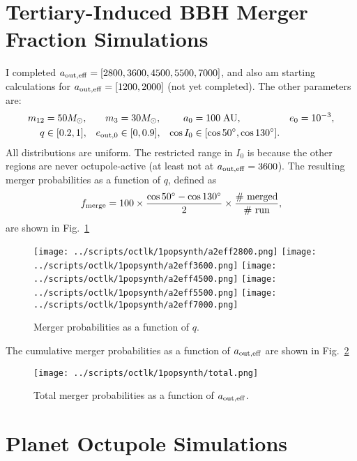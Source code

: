 \documentclass[11pt,
        usenames, %
        dvipsnames %
    ]{article}
\begin{document}
\onehalfspacing

\section{Tertiary-Induced BBH Merger Fraction Simulations}

I completed $a_{\rm out, eff} = [2800, 3600, 4500, 5500, 7000]$, and also am
starting calculations for $a_{\rm out, eff} = [1200, 2000]$ (not yet
completed). The other parameters are:
\begin{align*}
    m_{12} &= 50M_{\odot}, &
    m_3 &= 30M_{\odot}, &
    a_0 &= 100\;\mathrm{AU}, &
    e_0 &= 10^{-3},\\
    q &\in [0.2, 1], &
    e_{\rm out, 0} &\in [0, 0.9], &
    \cos I_0 &\in [\cos 50^\circ, \cos 130^\circ].
\end{align*}
All distributions are uniform. The restricted range in $I_0$ is because the
other regions are never octupole-active (at least not at $a_{\rm out, eff} =
3600$). The resulting merger probabilities as a
function of $q$, defined as
\begin{equation}
    f_{\rm merge} = 100 \times \frac{\cos 50^\circ - \cos 130^\circ}{2}
        \times \frac{\textrm{\# merged}}{\textrm{\# run}},
\end{equation}
are shown in Fig.~\ref{fig:all}
\begin{figure}[h]
    \centering
    \texttt{[image: ../scripts/octlk/1popsynth/a2eff2800.png]}
    \texttt{[image: ../scripts/octlk/1popsynth/a2eff3600.png]}
    \texttt{[image: ../scripts/octlk/1popsynth/a2eff4500.png]}
    \texttt{[image: ../scripts/octlk/1popsynth/a2eff5500.png]}
    \texttt{[image: ../scripts/octlk/1popsynth/a2eff7000.png]}
    \caption{Merger probabilities as a function of $q$.}\label{fig:all}
\end{figure}

The cumulative merger probabilities as a function of $a_{\rm out, eff}$ are
shown in Fig.~\ref{fig:merge}
\begin{figure}
    \centering
    \texttt{[image: ../scripts/octlk/1popsynth/total.png]}
    \caption{Total merger probabilities as a function of $a_{\rm out,
    eff}$.}\label{fig:merge}
\end{figure}

\clearpage

\section{Planet Octupole Simulations}
\end{document}
